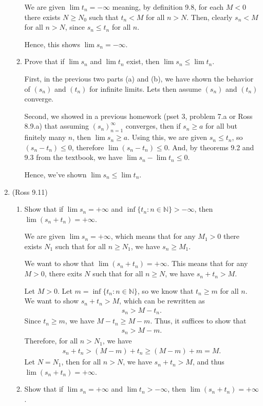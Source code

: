 \documentclass [10pt]{article}
\newcommand{\jg}[1]{{\color{blue} #1}}
\begin{document}
\begin{enumerate}
\begin{enumerate}
\jg{
We are given $\lim t_n = -\infty$ meaning, by definition 9.8, for each $M < 0$ there exists $N \geq N_0$ such that $t_n < M$ for all $n > N$. Then, clearly $s_n < M$ for all $n > N$, since $s_n \leq t_n$ for all $n$. 

Hence, this shows $\lim s_n = - \infty$.
}
\item Prove that if $\lim s_n$ and $\lim t_n$ exist, then $\lim s_n \leq \lim t_n$.

\jg{
First, in the previous two parts (a) and (b), we have shown the behavior of $(s_n)$ and $(t_n)$ for infinite limits. Lets then assume $(s_n)$ and $(t_n)$ converge.

Second, we showed in a previous homework (pset 3, problem 7.a or Ross 8.9.a) that assuming $(s_n)_{n=1}^{\infty}$ converges, then if $s_n \geq a$ for all but finitely many $n$, then $\lim s_n \geq a$. Using this, we are given $s_n \leq t_n$, so $(s_n - t_n) \leq 0$, therefore $\lim (s_n - t_n) \leq 0$. And, by theorems 9.2 and 9.3 from the textbook, we have $\lim s_n - \lim t_n \leq 0$. 

Hence, we've shown $\lim s_n \leq \lim t_n$. 
}
\end{enumerate}
\clearpage

\item (Ross 9.11)
\begin{enumerate}
\item Show that if $\lim s_n = +\infty$ and $\inf\{t_n : n \in \mathbb{N}\} > -\infty$, then $\lim (s_n + t_n)=+\infty$.

\jg{
We are given $\lim s_n = + \infty$, which means that for any $M_1 > 0$ there exists $N_1$ such that for all $n \geq N_1$, we have $s_n \geq M_1$. 

We want to show that $\lim (s_n + t_n) = + \infty$. This means that for any $M > 0$, there exits $N$ such that for all $n \geq N$, we have $s_n + t_n > M$. 

Let $M > 0$. Let $m = \inf \{t_n : n \in \mathbb{N} \}$, so we know that $t_n \geq m$ for all $n$. We want to show $s_n + t_n > M$, which can be rewritten as 
\begin{align*}
    s_n > M - t_n. 
\end{align*}
Since $t_n \geq m$, we have $M - t_n \geq M - m$. Thus, it suffices to show that 
\begin{align*}
    s_n > M - m.
\end{align*}
Therefore, for all $n > N_1$, we have 
\begin{align*}
    s_n + t_n > (M-m) + t_n \geq (M-m) + m = M.
\end{align*}
Let $N = N_1$, then for all $n > N$, we have $s_n + t_n > M$, and thus $\lim (s_n + t_n) = + \infty$. 
}
\item Show that if $\lim s_n = +\infty$ and $\lim t_n > -\infty$, then $\lim (s_n + t_n) =+\infty$.


\end{enumerate}
\end{enumerate}
\end{document}
